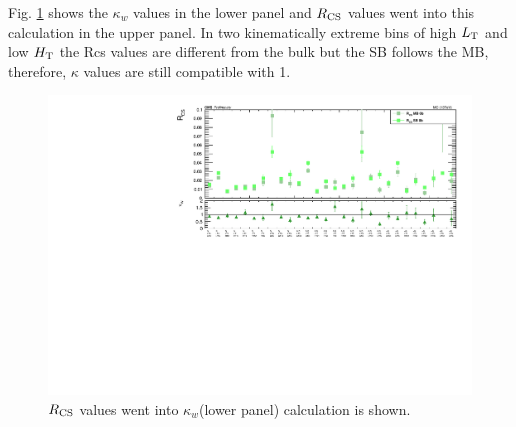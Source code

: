 Fig. \ref{fig:kappaW} shows the $\kappa_w$ values in the lower panel and $R_{\rm CS}$ values went into this calculation in the upper panel. In two kinematically extreme bins of high $L_{\rm T}$ and low $H_{\rm T}$ the Rcs values are different from the bulk but the SB follows the MB, therefore, $\kappa$ values are still compatible with 1.
\begin{figure}[!hbt]
    \begin{center}
 \includegraphics[width=1. \textwidth]{Plots/analysis/RCS/Spring16_templates_SR_Moriond2017_Summer16_lep_data_Kappa_W}
  \caption{ \label{fig:kappaW}  $R_{\rm CS}$ values went into $\kappa_w$(lower panel) calculation is shown.}
  \end{center}
\end{figure}
